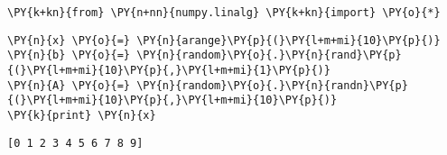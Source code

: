 {\par%
\vspace{-1\baselineskip}%
}%
\begin{notebookcell}[76]%
\begin{addmargin}[\cellleftmargin]{0em}%
{\smaller%
\par%
%
\vspace{-1\smallerfontscale}%
\begin{Verbatim}[commandchars=\\\{\}]
\PY{k+kn}{from} \PY{n+nn}{numpy.linalg} \PY{k+kn}{import} \PY{o}{*}
\end{Verbatim}
%
\par%
\vspace{-1\smallerfontscale}}%
\end{addmargin}
\end{notebookcell}



{\par%
\vspace{-1\baselineskip}%
}%
\begin{notebookcell}[77]%
\begin{addmargin}[\cellleftmargin]{0em}%
{\smaller%
\par%
%
\vspace{-1\smallerfontscale}%
\begin{Verbatim}[commandchars=\\\{\}]
\PY{n}{x} \PY{o}{=} \PY{n}{arange}\PY{p}{(}\PY{l+m+mi}{10}\PY{p}{)}
\PY{n}{b} \PY{o}{=} \PY{n}{random}\PY{o}{.}\PY{n}{rand}\PY{p}{(}\PY{l+m+mi}{10}\PY{p}{,}\PY{l+m+mi}{1}\PY{p}{)}
\PY{n}{A} \PY{o}{=} \PY{n}{random}\PY{o}{.}\PY{n}{randn}\PY{p}{(}\PY{l+m+mi}{10}\PY{p}{,}\PY{l+m+mi}{10}\PY{p}{)}
\PY{k}{print} \PY{n}{x}
\end{Verbatim}
%
\par%
\vspace{-1\smallerfontscale}}%
\end{addmargin}
\end{notebookcell}

\par\vspace{1\smallerfontscale}%
    \begin{addmargin}[\cellleftmargin]{0em}%
    {\smaller%
    \vspace{-1\smallerfontscale}%
    
    \begin{Verbatim}[commandchars=\\\{\}]
[0 1 2 3 4 5 6 7 8 9]
    \end{Verbatim}
}%
    \end{addmargin}%

